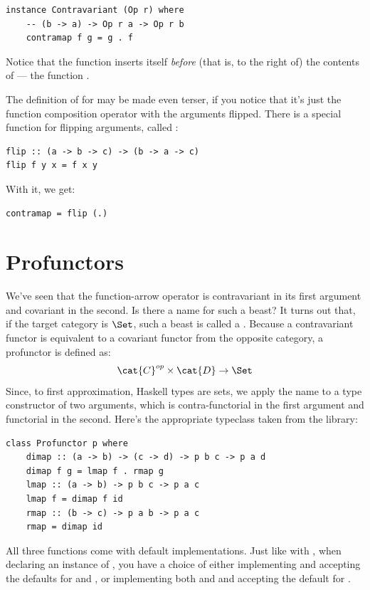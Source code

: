 \begin{Verbatim}
instance Contravariant (Op r) where
    -- (b -> a) -> Op r a -> Op r b
    contramap f g = g . f
\end{Verbatim}
Notice that the function  inserts itself \emph{before} (that
is, to the right of) the contents of  --- the function
.

The definition of  for  may be made even
terser, if you notice that it's just the function composition operator
with the arguments flipped. There is a special function for flipping
arguments, called :

\begin{Verbatim}
flip :: (a -> b -> c) -> (b -> a -> c)
flip f y x = f x y
\end{Verbatim}
With it, we get:

\begin{Verbatim}
contramap = flip (.)
\end{Verbatim}

\section{Profunctors}

We've seen that the function-arrow operator is contravariant in its
first argument and covariant in the second. Is there a name for such a
beast? It turns out that, if the target category is $\Set$, such a
beast is called a . Because a contravariant functor is
equivalent to a covariant functor from the opposite category, a
profunctor is defined as:
\[\cat{C}^{op} \times \cat{D} \to \Set\]
Since, to first approximation, Haskell types are sets, we apply the name
 to a type constructor  of two arguments,
which is contra-functorial in the first argument and functorial in the
second. Here's the appropriate typeclass taken from the
 library:

\begin{Verbatim}
class Profunctor p where
    dimap :: (a -> b) -> (c -> d) -> p b c -> p a d
    dimap f g = lmap f . rmap g
    lmap :: (a -> b) -> p b c -> p a c
    lmap f = dimap f id
    rmap :: (b -> c) -> p a b -> p a c
    rmap = dimap id
\end{Verbatim}
All three functions come with default implementations. Just like with
, when declaring an instance of ,
you have a choice of either implementing  and accepting
the defaults for  and , or implementing both
 and  and accepting the default for
.

